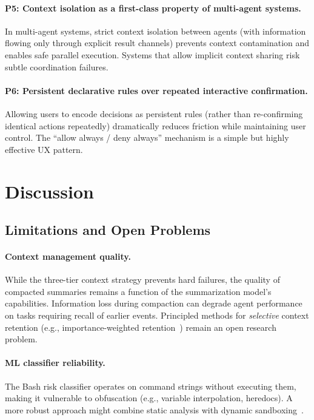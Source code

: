 \documentclass{article}
\begin{document}
\paragraph{P5: Context isolation as a first-class property of multi-agent systems.}
In multi-agent systems, strict context isolation between agents (with information flowing only through explicit result channels) prevents context contamination and enables safe parallel execution. Systems that allow implicit context sharing risk subtle coordination failures.

\paragraph{P6: Persistent declarative rules over repeated interactive confirmation.}
Allowing users to encode decisions as persistent rules (rather than re-confirming identical actions repeatedly) dramatically reduces friction while maintaining user control. The ``allow always / deny always'' mechanism is a simple but highly effective UX pattern.

\section{Discussion}

\subsection{Limitations and Open Problems}

\paragraph{Context management quality.}
While the three-tier context strategy prevents hard failures, the quality of compacted summaries remains a function of the summarization model's capabilities. Information loss during compaction can degrade agent performance on tasks requiring recall of earlier events. Principled methods for \emph{selective} context retention (e.g., importance-weighted retention~\cite{liu2023lost}) remain an open research problem.

\paragraph{ML classifier reliability.}
The Bash risk classifier operates on command strings without executing them, making it vulnerable to obfuscation (e.g., variable interpolation, heredocs). A more robust approach might combine static analysis with dynamic sandboxing~\cite{ruan2023identifying}.
\end{document}
